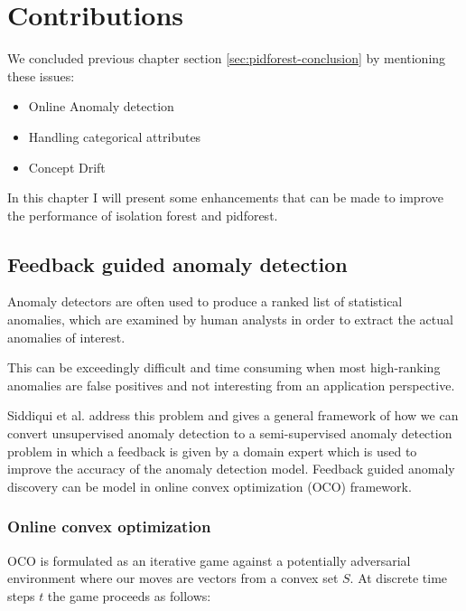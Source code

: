 \chapter{Contributions}
\label{ch:contributions}

We concluded previous chapter section \ref{sec:pidforest-conclusion} by mentioning these issues:
\vspace{-0.5em}
\begin{itemize}
    \setlength\itemsep{-0.5em}
    \item Online Anomaly detection
    \item Handling categorical attributes
    \item Concept Drift
\end{itemize}

In this chapter I will present some enhancements that can be made to improve the performance of isolation forest and pidforest.


\section{Feedback guided anomaly detection}
\label{sec:feedback-guided-anomaly-detection}

Anomaly detectors are often used to produce a ranked list of statistical anomalies, which are examined by human analysts in order to extract the actual anomalies of interest. 

This can be exceedingly difficult and time consuming when most high-ranking anomalies are false positives and not interesting from an application perspective. 

Siddiqui et al. \cite{10.1145/3219819.3220083} address this problem and gives a general framework of how we can convert unsupervised anomaly detection to a semi-supervised anomaly detection problem in which a feedback is given by a domain expert which is used to improve the accuracy of the anomaly detection model. 
Feedback guided anomaly discovery can be model in online convex optimization (OCO) framework. 


\subsection{Online convex optimization}
\label{subsec:online-convex-optimization}

OCO is formulated as an iterative game against a potentially adversarial environment where our moves are vectors from a convex set $S$. At discrete time steps $t$ the game proceeds as follows:

